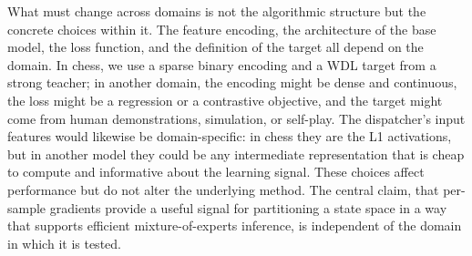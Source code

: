What must change across domains is not the algorithmic structure but the concrete choices within it. The feature encoding, the architecture of the base model, the loss function, and the definition of the target all depend on the domain. In chess, we use a sparse binary encoding and a WDL target from a strong teacher; in another domain, the encoding might be dense and continuous, the loss might be a regression or a contrastive objective, and the target might come from human demonstrations, simulation, or self-play. The dispatcher's input features would likewise be domain-specific: in chess they are the L1 activations, but in another model they could be any intermediate representation that is cheap to compute and informative about the learning signal. These choices affect performance but do not alter the underlying method. The central claim, that per-sample gradients provide a useful signal for partitioning a state space in a way that supports efficient mixture-of-experts inference, is independent of the domain in which it is tested.
